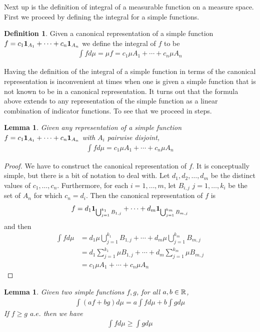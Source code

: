 \documentclass{amsart}
\newtheorem{lem}[thm]{Lemma}
\theoremstyle{remark}
\theoremstyle{definition}
\newtheorem{defn}[thm]{Definition}
\begin{document}
Next up is the definition of integral of a measurable function on a
measure space.  First we proceed by defining the integral for a simple functions.
\begin{defn}
Given a canonical representation of a simple function $f =
c_1 \textbf{1}_{A_1} + \cdots + c_n \textbf{1}_{A_n}$ we
define the integral of $f$ to be
\begin{align*}
\int f d\mu = \mu f = c_1 \mu A_1 + \cdots + c_n \mu A_n
\end{align*}
\end{defn}
Having the definition of the integral of a simple function in terms of
the canonical representation is inconvenient at times when one is
given a simple function that is not known to be in a canonical
representation.  It turns out that the formula above extends to any
representation of the simple function as a linear combination of
indicator functions.  To see that we proceed in steps.
\begin{lem}Given any representation of a simple function $f =
c_1 \textbf{1}_{A_1} + \cdots + c_n \textbf{1}_{A_n}$ with
$A_i$ pairwise disjoint,
\begin{align*}
\int f d\mu = c_1 \mu A_1 + \cdots + c_n \mu A_n
\end{align*}
\end{lem}
\begin{proof}We have to construct the canonical representation of
  $f$.  It is conceptually simple, but there is a bit of notation to
  deal with.
  Let $d_1, d_2, \dots, d_m$ be the distinct values of $c_1, \dots,
  c_n$.  Furthermore, for each $i=1,\dots,m$, let $B_{i,j}$ 
  $j=1,\dots,k_i$ be the set of $A_n$ for which $c_n = d_i$.  Then the
  canonical representation of $f$ is 
\begin{align*}
f = d_1 \textbf{1}_{\bigcup_{j=1}^{k_1} B_{1,j}} + \cdots + d_m \textbf{1}_{\bigcup_{j=1}^{k_m} B_{m,j}}
\end{align*}
and then 
\begin{align*}
\int f d \mu &= d_1 \mu \bigcup_{j=1}^{k_1} B_{1,j} + \cdots + d_m \mu
\bigcup_{j=1}^{k_m} B_{m,j} \\
&= d_1 \sum_{j=1}^{k_1} \mu B_{1,j} + \cdots + d_m 
\sum_{j=1}^{k_m} \mu B_{m,j} \\
&= c_1 \mu A_1 + \cdots + c_n \mu A_n
\end{align*}
\end{proof}
\begin{lem}\label{LinearityIntegralSimpleFunctions}Given two simple functions $f,g$, for all $a,b \in \mathbb{R}$,
 \begin{align*}
\int \left (af + bg \right ) d \mu = a \int f d \mu + b \int g d \mu
\end{align*}
If $f \geq g$ $a.e.$ then we have
 \begin{align*}
\int f d \mu \geq \int g d \mu
\end{align*}
\end{lem}
\end{document}
